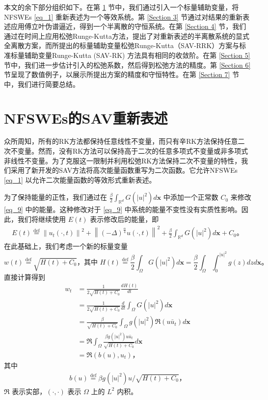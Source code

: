 本文的余下部分组织如下。在第 \ref{Section 2} 节中，我们通过引入一个标量辅助变量，将NFSWEs \eqref{eq_1} 重新表述为一个等效系统。第 \ref{Section 3} 节通过对结果的重新表述应用傅立叶伪谱逼近，得到一个半离散的守恒系统。在第 \ref{Section 4} 节，我们通过在时间上应用松弛Runge-Kutta方法，提出了对重新表述的半离散系统的显式全离散方案，而所提出的标量辅助变量松弛Runge-Kutta（SAV-RRK）方案与标准标量辅助变量Runge-Kutta (SAV-RK) 方法具有相同的收敛阶。在第 \ref{Section 5} 节中，我们进一步估计引入的松弛系数，然后得到松弛方法的精度。第 \ref{Section 6} 节呈现了数值例子，以展示所提出方案的精度和守恒特性。在第 \ref{Section 7} 节中，我们进行简要总结。

\section{NFSWEs的SAV重新表述}\label{Section 2}

众所周知，所有的RK方法都保持任意线性不变量，而只有辛RK方法保持任意二次不变量。然而，没有RK方法可以保持高于二次的任意多项式不变量或非多项式非线性不变量。为了克服这一限制并利用松弛RK方法保持二次不变量的特性，我们采用了新开发的SAV方法将高次能量函数重写为二次函数。它允许NFSWEs \eqref{eq_1} 以允许二次能量函数的等效形式重新表述。

为了保持能量的正性，我们通过在 $\frac{\beta}{2} \int_{\mathbb{R}^d} G\left(|u|^2\right) d \boldsymbol{x}$ 中添加一个正常数 $C_0$ 来修改 \eqref{eq_9} 中的能量。这种修改对于 \eqref{eq_9} 中系统的能量不变性没有实质性影响。因此，我们将继续使用 $E(t)$ 表示修改后的能量，即
\begin{align}\label{eq_9_1}
E(t)\overset{\text{def}}{=}\left\|u_{t}(\cdot, t)\right\|^{2}+\left\|(-\Delta)^{\frac{\alpha}{4}} u(\cdot, t)\right\|^{2}+\frac{\beta}{2} \int_{\mathbb{R}^d} G\left(|u|^2\right) d \boldsymbol{x} + C_0。
\end{align}
在此基础上，我们考虑一个新的标量变量
\begin{equation}
w(t)\overset{\text{def}}{=}\sqrt{H(t)+C_0} \text {，其中 } H(t)\overset{\text{def}}{=}\frac{\beta}{2} \int_{\Omega} G\left(|u|^2\right) d \boldsymbol{x}=\frac{\beta}{2}\int_{\Omega} \int_0^{|u|^2} g(z) d z d \boldsymbol{x}。
\end{equation}
直接计算得到
\begin{align}
w_t & =\frac{1}{2 \sqrt{H(t)+C_0}} \frac{d H(t)}{d t} \nonumber\\
& =\frac{1}{2 \sqrt{H(t)+C_0}} \frac{d}{d t} \int_{\Omega} G(|u|^2) d \boldsymbol{x} \nonumber\\
& =\frac{\beta}{\sqrt{H(t)+C_0}} \int_{\Omega} g(|u|^2) \Re\left(u \bar{u}_t\right) d \boldsymbol{x}\nonumber\\
& =\Re \int_{\Omega} \frac{\beta g(|u|^2) u \bar{u}_t}{\sqrt{H(t)+C_0}} d \boldsymbol{x} \nonumber\\
& =\Re\left(b(u), u_t\right)， \label{eq:2-1}
\end{align}
其中
\begin{align}
b(u)\overset{\text{def}}{=}\beta g(|u|^2) u / \sqrt{H(t)+C_0}，
\end{align}
$\Re$ 表示实部，$(\cdot, \cdot)$ 表示 $\Omega$ 上的 $L^2$ 内积。

